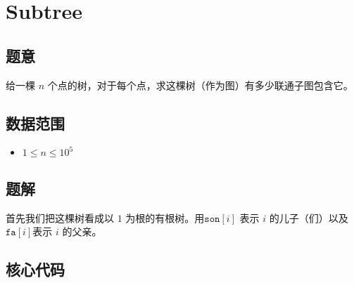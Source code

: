 \section{Subtree}
\subsection*{题意}
给一棵 $n$ 个点的树，对于每个点，求这棵树（作为图）有多少联通子图包含它。
\subsection*{数据范围}
\begin{itemize}
\item $1 \leq n \leq 10^5$
\end{itemize}

\subsection*{题解}

首先我们把这棵树看成以 $1$ 为根的有根树。用$\texttt{son}[i]$ 表示 $i$ 的儿子（们）以及$\texttt{fa}[i]$表示 $i$ 的父亲。









\subsection*{核心代码}
\inputminted[linenos,autogobble]{cpp}{./Code/V.cpp}
\newpage